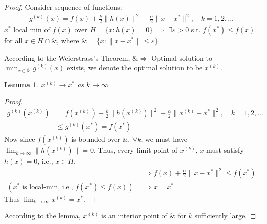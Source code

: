 \documentclass[11pt,a4paper]{article}
\newtheorem{lemma}{Lemma}
\begin{document}
\begin{proof}
    Consider sequence of functions:
    \begin{equation}
        \begin{aligned}
            g^{(k)}(x)=f(x)+\frac{k}{2}\|h(x)\|^2+\frac{\alpha}{2}\|x-x^*\|^2,\quad k=1,2,...
        \end{aligned}
        \nonumber
    \end{equation}
    $x^*$ local min of $f(x)$ over $H=\{x:h(x)=0\}$ $\Rightarrow$ $\exists\varepsilon>0$ s.t. $f(x^*)\leq f(x)$ for all $x\in H\cap \&$, where $\&=\{x:\|x-x^*\|\leq \varepsilon\}$.

    According to the Weierstrass's Theorem, $\&\Rightarrow$ Optimal solution to $\min_{x\in\&}g^{(k)}(x)$ exists, we denote the optimal solution to be $x^{(k)}$.
    \begin{lemma}
        $x^{(k)}\rightarrow	x^*$ as $k \rightarrow \infty$
    \end{lemma}
    \begin{proof}
        \begin{equation}
            \begin{aligned}
                g^{(k)}(x^{(k)})&=f(x^{(k)})+\frac{k}{2}\|h(x^{(k)})\|^2+\frac{\alpha}{2}\|x^{(k)}-x^*\|^2,\quad k=1,2,...\\
                &\leq g^{(k)}(x^*)=f(x^*)
            \end{aligned}
            \nonumber
        \end{equation}
    Now since $f(x^{(k)})$ is bounded over $\&$, $\forall k$, we must have $\lim_{k \rightarrow	\infty}\|h(x^{(k)})\|=0$. Thus, every limit point of $x^{(k)}$, $\bar{x}$ must satisfy $h(\bar{x})=0$, i.e., $\bar{x}\in H$.
    \begin{equation}
        \begin{aligned}
            &\Rightarrow	f(\bar{x})+\frac{\alpha}{2}\|\bar{x}-x^*\|^2\leq f(x^*)\\
            (x^*\text{ is local-min, i.e., }f(x^*)\leq f(\bar{x}))\quad &\Rightarrow \bar{x}=x^*
        \end{aligned}
        \nonumber
    \end{equation}
    Thus $\lim_{k \rightarrow\infty}x^{(k)}=x^*$.
    \end{proof}
    According to the lemma, $x^{(k)}$ is an interior point of $\&$ for $k$ sufficiently large.


\end{proof}
\end{document}
